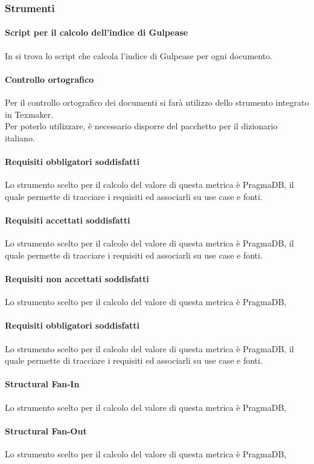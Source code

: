 \subsubsection{Strumenti}
\paragraph{Script per il calcolo dell'indice di Gulpease}
In \GulScript{} si trova lo script che calcola l'indice di Gulpease per ogni documento.
\paragraph{Controllo ortografico}
Per il controllo ortografico dei documenti si farà utilizzo dello strumento integrato in Texmaker.\\
Per poterlo utilizzare, è necessario disporre del pacchetto per il dizionario italiano.

\paragraph{Requisiti obbligatori soddisfatti}
Lo strumento scelto per il calcolo del valore di questa metrica è PragmaDB, il quale permette di tracciare i requisiti ed associarli su use case e fonti.
\paragraph{Requisiti accettati soddisfatti}
Lo strumento scelto per il calcolo del valore di questa metrica è PragmaDB, il quale permette di tracciare i requisiti ed associarli su use case e fonti.
\paragraph{Requisiti non accettati soddisfatti}
Lo strumento scelto per il calcolo del valore di questa metrica è PragmaDB,
\paragraph{Requisiti obbligatori soddisfatti}
Lo strumento scelto per il calcolo del valore di questa metrica è PragmaDB, il quale permette di tracciare i requisiti ed associarli su use case e fonti.
\paragraph{Structural Fan-In}
Lo strumento scelto per il calcolo del valore di questa metrica è PragmaDB,
\paragraph{Structural Fan-Out}
Lo strumento scelto per il calcolo del valore di questa metrica è PragmaDB,
